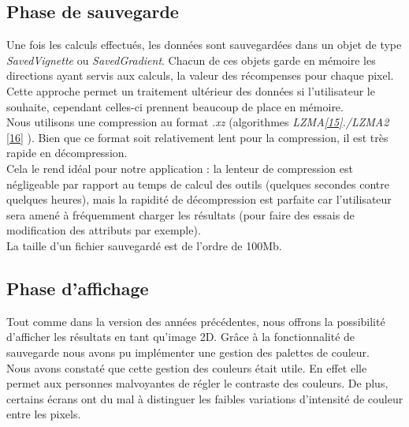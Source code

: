 \documentclass[12pt]{article}
\begin{document}
\subsection{Phase de sauvegarde}

Une fois les calculs effectués, les données sont sauvegardées dans un objet de type \emph{SavedVignette} ou \emph{SavedGradient}. Chacun de ces objets garde en mémoire les directions ayant servis aux calculs, la valeur des récompenses pour chaque pixel. \\

Cette approche permet un traitement ultérieur des données si l'utilisateur le souhaite, cependant celles-ci prennent beaucoup de place en mémoire. \\

Nous utilisons une compression au format \emph{.xz} (algorithmes \emph{LZMA\href{https://fr.wikipedia.org/wiki/LZMA}{[15]}./LZMA2} \href{https://en.wikipedia.org/wiki/Lempel%E2%80%93Ziv%E2%80%93Markov_chain_algorithm}{[16]}
). Bien que ce format soit relativement lent pour la compression, il est très rapide en décompression. \\

Cela le rend idéal pour notre application : la lenteur de compression est négligeable par rapport au temps de calcul des outils (quelques secondes contre quelques heures), mais la rapidité de décompression est parfaite car l'utilisateur sera amené à fréquemment charger les résultats (pour faire des essais de modification des attributs par exemple). \\

La taille d'un fichier sauvegardé est de l'ordre de 100Mb. \\

\subsection{Phase d'affichage}
\label{sec:affichage}

Tout comme dans la version des années précédentes, nous offrons la possibilité d'afficher les résultats en tant qu'image 2D. Grâce à la fonctionnalité de sauvegarde nous avons pu implémenter une gestion des palettes de couleur. \\

Nous avons constaté que cette gestion des couleurs était utile. En effet elle permet aux personnes malvoyantes de régler le contraste des couleurs. De plus, certains écrans ont du mal à distinguer les faibles variations d'intensité de couleur entre les pixels. \\
\end{document}
